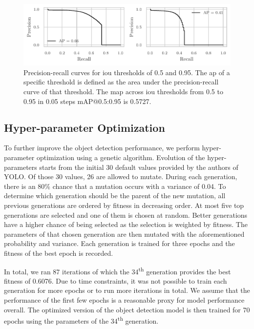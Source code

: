 \documentclass[draft,final]{vutinfth} %
\begin{document}
\begin{figure}
  \centering
  \includegraphics{graphics/APpt5-pt95.pdf}
  \caption[Object detection AP@0.5 and AP@0.95.]{Precision-recall
    curves for \gls{iou} thresholds of 0.5 and 0.95. The \gls{ap} of a
    specific threshold is defined as the area under the
    precision-recall curve of that threshold. The \gls{map} across
    \gls{iou} thresholds from 0.5 to 0.95 in 0.05 steps
    \textsf{mAP}@0.5:0.95 is 0.5727.}
  \label{fig:yolo-ap}
\end{figure}

\subsection{Hyper-parameter Optimization}
\label{ssec:yolo-hyp-opt}

To further improve the object detection performance, we perform
hyper-parameter optimization using a genetic algorithm. Evolution of
the hyper-parameters starts from the initial 30 default values
provided by the authors of YOLO. Of those 30 values, 26 are allowed to
mutate. During each generation, there is an 80\% chance that a
mutation occurs with a variance of 0.04. To determine which generation
should be the parent of the new mutation, all previous generations are
ordered by fitness in decreasing order. At most five top generations
are selected and one of them is chosen at random. Better generations
have a higher chance of being selected as the selection is weighted by
fitness. The parameters of that chosen generation are then mutated
with the aforementioned probability and variance. Each generation is
trained for three epochs and the fitness of the best epoch is
recorded.

In total, we ran 87 iterations of which the 34\textsuperscript{th}
generation provides the best fitness of 0.6076. Due to time
constraints, it was not possible to train each generation for more
epochs or to run more iterations in total. We assume that the
performance of the first few epochs is a reasonable proxy for model
performance overall. The optimized version of the object detection
model is then trained for 70 epochs using the parameters of the
34\textsuperscript{th} generation.
\end{document}
